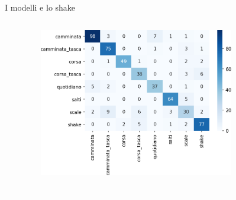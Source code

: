 \documentclass{beamer}
\begin{document}
\begin{frame}{I modelli e lo shake}
\begin{columns}[T]
\begin{column}{.5\textwidth}
\end{column}%
\hfill%
\begin{column}{.5\textwidth}
\begin{figure}[H]
\includegraphics[width=0.8\textwidth]{../figure/confusionMatrix-QDA.png}
\end{figure}
\begin{figure}[H]
\includegraphics[width=\textwidth]{../figure/confusionMatrix-Tree.png}
\end{figure}
\end{column}%
\end{columns}
\end{frame}
\end{document}
